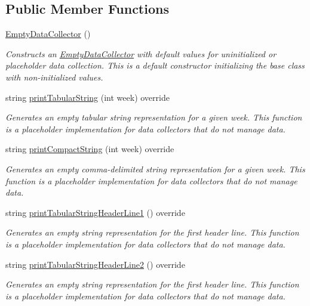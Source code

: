 \subsection*{Public Member Functions}
\begin{DoxyCompactItemize}
\item 
\mbox{\hyperlink{classEmptyDataCollector_ae6ec59ac659f009c76525f00c5319524}{Empty\+Data\+Collector}} ()
\begin{DoxyCompactList}\small\item\em Constructs an \mbox{\hyperlink{classEmptyDataCollector}{Empty\+Data\+Collector}} with default values for uninitialized or placeholder data collection. This is a default constructor initializing the base class with non-\/initialized values. \end{DoxyCompactList}\item 
string \mbox{\hyperlink{classEmptyDataCollector_a2bb44e454376ed518c4d89cf324b8bd7}{print\+Tabular\+String}} (int week) override
\begin{DoxyCompactList}\small\item\em Generates an empty tabular string representation for a given week. This function is a placeholder implementation for data collectors that do not manage data. \end{DoxyCompactList}\item 
string \mbox{\hyperlink{classEmptyDataCollector_ad4a4ebbf610b3939e34442795a392dd5}{print\+Compact\+String}} (int week) override
\begin{DoxyCompactList}\small\item\em Generates an empty comma-\/delimited string representation for a given week. This function is a placeholder implementation for data collectors that do not manage data. \end{DoxyCompactList}\item 
string \mbox{\hyperlink{classEmptyDataCollector_afa47b48abb2ed59c16f1253e55f93cf2}{print\+Tabular\+String\+Header\+Line1}} () override
\begin{DoxyCompactList}\small\item\em Generates an empty string representation for the first header line. This function is a placeholder implementation for data collectors that do not manage data. \end{DoxyCompactList}\item 
string \mbox{\hyperlink{classEmptyDataCollector_aa71282121251d344d674223409445be9}{print\+Tabular\+String\+Header\+Line2}} () override
\begin{DoxyCompactList}\small\item\em Generates an empty string representation for the first header line. This function is a placeholder implementation for data collectors that do not manage data. \end{DoxyCompactList}\item 

\end{DoxyCompactItemize}
